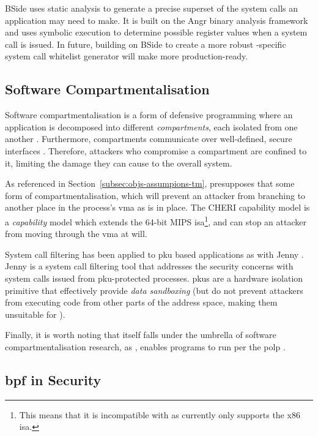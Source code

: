 BSide \cite{BSIDE} uses static analysis to generate a precise
superset of the system calls an application may need to make. It is built on 
the Angr \cite{angr2025} binary analysis framework and uses symbolic execution
to determine possible register values when a system call is issued. In future,
building on BSide to create a more robust \af-specific system call whitelist
generator will make \af more production-ready.

\subsection{Software Compartmentalisation}

Software compartmentalisation is a form of defensive programming where an
application is decomposed into different \textit{compartments}, each isolated
from one another \cite{SOK}. Furthermore, compartments communicate over
well-defined, secure interfaces \cite{CONFFUZZ}. Therefore, attackers who
compromise a compartment are confined to it, limiting the damage they can
cause to the overall system.

As referenced in Section~\ref{subsec:objs-assumpions-tm}, \af presupposes that some
form of compartmentalisation, which will prevent an attacker from branching to
another place in the process's \ac{vma} as is in place. The CHERI capability
model \cite{CHERI} is a \textit{capability} model which extends the 64-bit MIPS
\ac{isa}\footnote{This means that it is incompatible with \af as \af
currently only supports the x86 \ac{isa}.}, and can stop an attacker from moving through the
\ac{vma} at will. 

System call filtering has been applied to \ac{pku} based applications as with
Jenny \cite{JENNY}. Jenny is a system call filtering tool that addresses
the security concerns with system calls issued from
\ac{pku}-protected processes. \acp{pku} are a hardware isolation primitive that
effectively provide \textit{data sandboxing} (but do not prevent attackers
from executing code from other parts of the address space, making them unsuitable for
\af).

Finally, it is worth noting that \af itself falls under the umbrella of software
compartmentalisation research, as \af, enables programs to run per
the \ac{polp} \cite{SALTZER_SCHROEDER}.

\subsection{\ac{bpf} in Security}\label{subsec:bpf-in-security}

